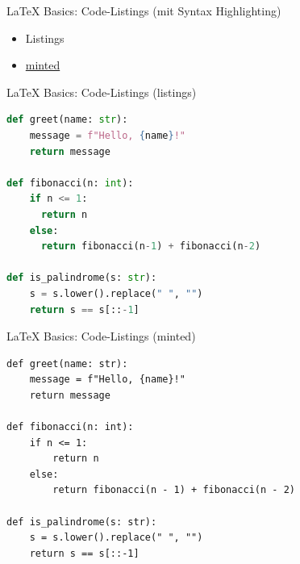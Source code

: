 \documentclass[main.tex]{subfiles}
\begin{document}
\begin{frame}[fragile]{\LaTeX{} Basics: Code-Listings (mit Syntax Highlighting)}
    \begin{itemize}
        \item Listings
        \medskip
        \item \href{https://tex.stackexchange.com/a/389221}{minted}
    \end{itemize}
\end{frame}

\begin{frame}[fragile]{\LaTeX{} Basics: Code-Listings (listings)}
    \begin{lstlisting}[language=Python]
def greet(name: str):
    message = f"Hello, {name}!"
    return message

def fibonacci(n: int):
    if n <= 1:
      return n
    else:
      return fibonacci(n-1) + fibonacci(n-2)

def is_palindrome(s: str):
    s = s.lower().replace(" ", "")
    return s == s[::-1]
    \end{lstlisting}
\end{frame}

\begin{frame}[fragile]{\LaTeX{} Basics: Code-Listings (minted)}
    \begin{verbatim}
def greet(name: str):
    message = f"Hello, {name}!"
    return message

def fibonacci(n: int):
    if n <= 1:
        return n
    else:
        return fibonacci(n - 1) + fibonacci(n - 2)

def is_palindrome(s: str):
    s = s.lower().replace(" ", "")
    return s == s[::-1]
    \end{verbatim}
\end{frame}
\end{document}
